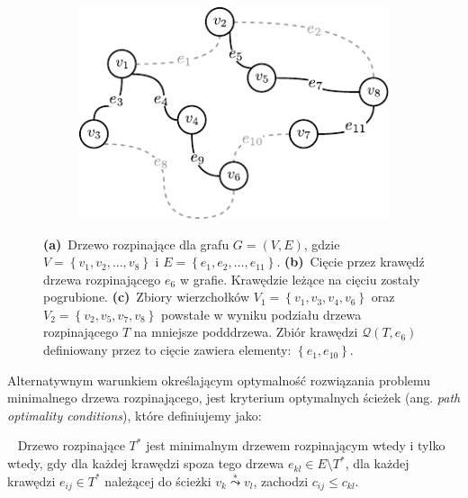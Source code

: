 \begin{figure}[!htbp]
\begin{subfigure}[b]{0.32\textwidth}
		\includegraphics[width=\textwidth]{Chapter_I/CUT-example/c}
		\caption{}
		\label{fig:cut:c}
	\end{subfigure}
	\hfill\null
	\caption{
		\textbf{(a)}~Drzewo rozpinające dla grafu $G = \left( V, E \right)$, gdzie $V = \left\{ v_{1}, v_{2}, \dots, v_{8} \right\}$ i $E = \left\{ e_{1}, e_{2}, \dots, e_{11} \right\}$.
		\textbf{(b)}~Cięcie przez krawędź drzewa rozpinającego $e_{6}$ w grafie. Krawędzie leżące na cięciu zostały pogrubione.
		\textbf{(c)}~Zbiory wierzchołków $V_{1} = \left\{ v_{1}, v_{3}, v_{4}, v_{6} \right\}$ oraz $V_{2} = \left\{ v_{2}, v_{5}, v_{7}, v_{8} \right\}$ powstałe w wyniku podziału drzewa rozpinającego $T$ na mniejsze podddrzewa. Zbiór krawędzi $\mathcal{Q} \left( T, e_{6} \right)$ definiowany przez to cięcie zawiera elementy: $\left\{ e_{1}, e_{10} \right\}$.
	}
	\label{fig:cut}
\end{figure}

Alternatywnym warunkiem określającym optymalność rozwiązania problemu minimalnego drzewa rozpinającego, jest kryterium optymalnych ścieżek (ang. \textit{path optimality conditions}), które definiujemy jako:

\begin{theorem}\label{def:optpath}~\cite[$519$]{Ahuja:1993:NFT:137406}
	Drzewo rozpinające $T^{\ast}$ jest minimalnym drzewem rozpinającym wtedy i tylko wtedy, gdy dla każdej krawędzi spoza tego drzewa $e_{kl} \in E \setminus T^{\ast}$, dla każdej krawędzi $e_{ij} \in T^{\ast}$ należącej do ścieżki $v_{k} \overset{\ast}{\leadsto} v_{l}$, zachodzi $c_{ij} \leqslant c_{kl}$.
\end{theorem}

